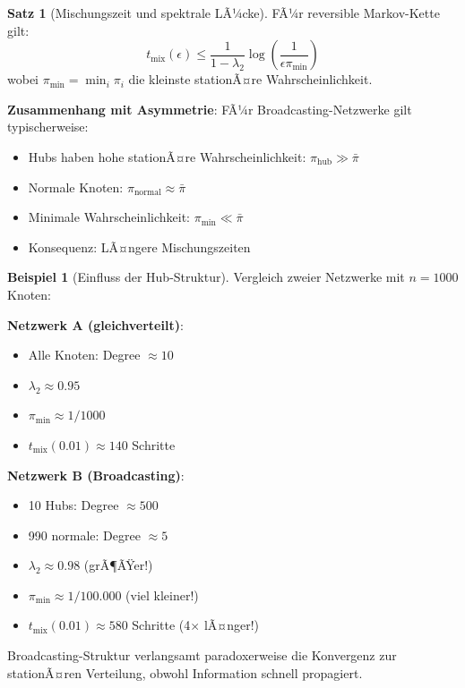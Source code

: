 ﻿\documentclass[a4paper,12pt]{report}
\theoremstyle{definition}
\newtheorem{beispiel}{Beispiel}
\newtheorem{satz}{Satz}
\begin{document}
	\begin{satz}[Mischungszeit und spektrale LÃ¼cke]
		FÃ¼r reversible Markov-Kette gilt:
		\[
		t_{\text{mix}}(\epsilon) \leq \frac{1}{1-\lambda_2} \log\left(\frac{1}{\epsilon \pi_{\min}}\right)
		\]
		wobei $\pi_{\min} = \min_i \pi_i$ die kleinste stationÃ¤re Wahrscheinlichkeit.
		
		\textbf{Zusammenhang mit Asymmetrie}:
		FÃ¼r Broadcasting-Netzwerke gilt typischerweise:
		\begin{itemize}
			\item Hubs haben hohe stationÃ¤re Wahrscheinlichkeit: $\pi_{\text{hub}} \gg \bar{\pi}$
			\item Normale Knoten: $\pi_{\text{normal}} \approx \bar{\pi}$
			\item Minimale Wahrscheinlichkeit: $\pi_{\min} \ll \bar{\pi}$
			\item Konsequenz: LÃ¤ngere Mischungszeiten
		\end{itemize}
	\end{satz}
	
	\begin{beispiel}[Einfluss der Hub-Struktur]
		Vergleich zweier Netzwerke mit $n = 1000$ Knoten:
		
		\textbf{Netzwerk A (gleichverteilt)}:
		\begin{itemize}
			\item Alle Knoten: Degree $\approx 10$
			\item $\lambda_2 \approx 0.95$
			\item $\pi_{\min} \approx 1/1000$
			\item $t_{\text{mix}}(0.01) \approx 140$ Schritte
		\end{itemize}
		
		\textbf{Netzwerk B (Broadcasting)}:
		\begin{itemize}
			\item 10 Hubs: Degree $\approx 500$
			\item 990 normale: Degree $\approx 5$
			\item $\lambda_2 \approx 0.98$ (grÃ¶ÃŸer!)
			\item $\pi_{\min} \approx 1/100.000$ (viel kleiner!)
			\item $t_{\text{mix}}(0.01) \approx 580$ Schritte (4$\times$ lÃ¤nger!)
		\end{itemize}
		
		Broadcasting-Struktur verlangsamt paradoxerweise die Konvergenz zur stationÃ¤ren Verteilung, obwohl Information schnell propagiert.
	\end{beispiel}
	
\end{document}
